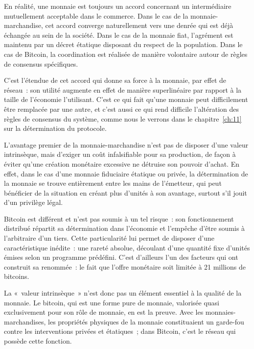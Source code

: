 En réalité, une monnaie est toujours un accord concernant un intermédiaire mutuellement acceptable dans le commerce. Dans le cas de la monnaie-marchandise, cet accord converge naturellement vers une denrée qui est déjà échangée au sein de la société. Dans le cas de la monnaie fiat, l'agrément est maintenu par un décret étatique disposant du respect de la population. Dans le cas de Bitcoin, la coordination est réalisée de manière volontaire autour de règles de consensus spécifiques.

C'est l'étendue de cet accord qui donne sa force à la monnaie, par effet de réseau~: son utilité augmente en effet de manière superlinéaire par rapport à la taille de l'économie l'utilisant. C'est ce qui fait qu'une monnaie peut difficilement être remplacée par une autre, et c'est aussi ce qui rend difficile l'altération des règles de consensus du système, comme nous le verrons dans le chapitre~\ref{ch:11} sur la détermination du protocole.

L'avantage premier de la monnaie-marchandise n'est pas de disposer d'une valeur intrinsèque, mais d'exiger un coût infalsifiable pour sa production, de façon à éviter qu'une création monétaire excessive ne détruise son pouvoir d'achat. En effet, dans le cas d'une monnaie fiduciaire étatique ou privée, la détermination de la monnaie se trouve entièrement entre les mains de l'émetteur, qui peut bénéficier de la situation en créant plus d'unités à son avantage, surtout s'il jouit d'un privilège légal.

Bitcoin est différent et n'est pas soumis à un tel risque~: son fonctionnement distribué répartit sa détermination dans l'économie et l'empêche d'être soumis à l'arbitraire d'un tiers. Cette particularité lui permet de disposer d'une caractéristique inédite~: une rareté absolue, découlant d'une quantité fixe d'unités émises selon un programme prédéfini. C'est d'ailleurs l'un des facteurs qui ont construit sa renommée~: le fait que l'offre monétaire soit limitée à 21 millions de bitcoins.

La «~valeur intrinsèque~» n'est donc pas un élément essentiel à la qualité de la monnaie. Le bitcoin, qui est une forme pure de monnaie, valorisée quasi exclusivement pour son rôle de monnaie, en est la preuve. Avec les monnaies-marchandises, les propriétés physiques de la monnaie constituaient un garde-fou contre les interventions privées et étatiques~; dans Bitcoin, c'est le réseau qui possède cette fonction.

